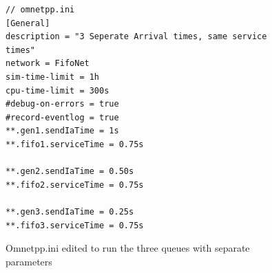 \documentclass{article}
\begin{document}
\begin{figure}[H]
\label{Omnet_ini}
\begin{lstlisting}
// omnetpp.ini
[General]
description = "3 Seperate Arrival times, same service times"
network = FifoNet
sim-time-limit = 1h
cpu-time-limit = 300s
#debug-on-errors = true
#record-eventlog = true
**.gen1.sendIaTime = 1s
**.fifo1.serviceTime = 0.75s

**.gen2.sendIaTime = 0.50s
**.fifo2.serviceTime = 0.75s

**.gen3.sendIaTime = 0.25s
**.fifo3.serviceTime = 0.75s
\end{lstlisting}
\vspace{-1cm}
\caption*{Omnetpp.ini edited to run the three queues with separate parameters}
\end{figure}
\end{document}
